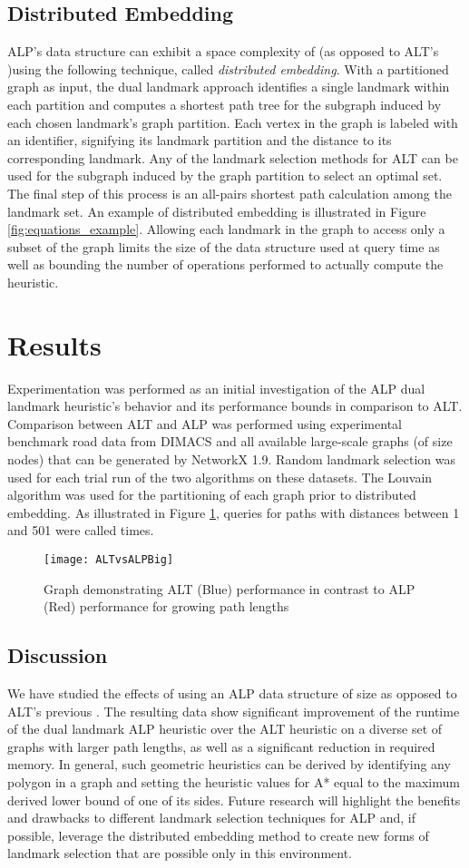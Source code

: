 \documentclass{siam-wns-article}
\begin{document}
\subsection{Distributed Embedding}
ALP's data structure can exhibit a space complexity of  (as opposed to ALT's )using the following technique, called \emph{distributed embedding}. With a partitioned graph as input, the dual landmark approach identifies a single landmark within each partition and computes a shortest path tree for the subgraph induced by each chosen landmark's graph partition. Each vertex in the graph is labeled with an identifier, signifying its landmark partition and the distance to its corresponding landmark. Any of the landmark selection methods for ALT can be used for the subgraph induced by the graph partition to select an optimal set. The final step of this process is an all-pairs shortest path calculation among the landmark set. An example of distributed embedding is illustrated in Figure \ref{fig:equations_example}. Allowing each landmark in the graph to access only a subset of the graph limits the size of the data structure used at query time as well as bounding the number of operations performed to actually compute the heuristic.
\section{Results}
Experimentation was performed as an initial investigation of the ALP dual landmark heuristic's behavior and its performance bounds in comparison to ALT. Comparison between ALT and ALP was performed using experimental benchmark road data from DIMACS and all available large-scale graphs (of size  nodes) that can be generated by NetworkX 1.9. Random landmark selection was used for each trial run of the two algorithms on these datasets. The Louvain algorithm \cite{ICT4DBibliography2429} was used for the partitioning of each graph prior to distributed embedding. As illustrated in Figure \ref{fig:ALTvALP}, queries for paths with distances between 1 and 501 were called  times.
\begin{figure}
\centering
\texttt{[image: ALTvsALPBig]}
\caption{Graph demonstrating ALT (Blue) performance in contrast to ALP (Red) performance for growing path lengths}
\label{fig:ALTvALP}
\end{figure}
\subsection{Discussion}
We have studied the effects of using an ALP data structure of size  as opposed to ALT's previous . The resulting data show significant improvement of the runtime of the dual landmark ALP heuristic over the ALT heuristic on a diverse set of graphs with larger path lengths, as well as a significant reduction in required memory. In general, such geometric heuristics can be derived by identifying any polygon in a graph and setting the heuristic values for A* equal to the maximum derived lower bound of one of its sides. Future research will highlight the benefits and drawbacks to different landmark selection techniques for ALP and, if possible, leverage the distributed embedding method to create new forms of landmark selection that are possible only in this environment.
\end{document}
